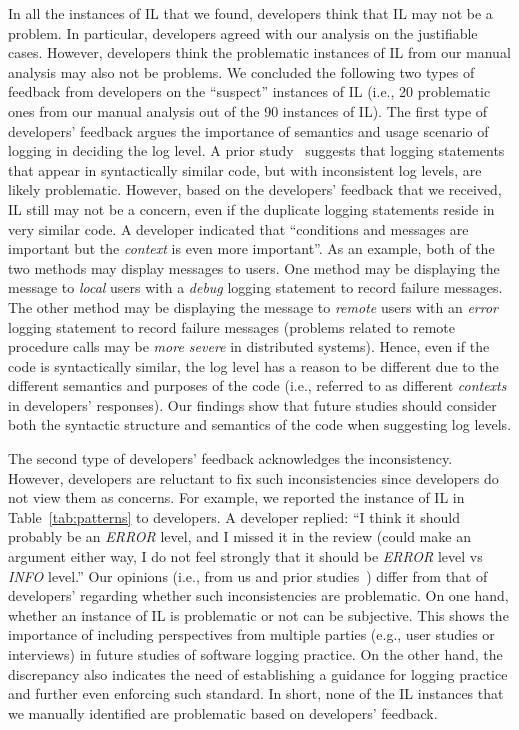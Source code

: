  In all the instances of IL that we found, developers think that IL may not be a problem. In particular, developers agreed with our analysis on the justifiable cases. However, developers think the problematic instances of IL from our manual analysis may also not be problems. We concluded the following two types of feedback from developers on the ``suspect'' instances of IL (i.e., 20 problematic ones from our manual analysis out of the 90 instances of IL).
The first type of developers' feedback argues the importance of semantics and usage scenario of logging in deciding the log level. A prior study~\cite{Yuan:2012:CLP:2337223.2337236} suggests that logging statements that appear in syntactically similar code, but with inconsistent log levels, are likely problematic. However, based on the developers' feedback that we received, IL still may not be a concern, even if the duplicate logging statements reside in very similar code. A developer indicated that ``conditions and messages are important but the {\it context} is even more important''. As an example, both of the two methods may display messages to users. One method may be displaying the message to {\em local} users with a {\em debug} logging statement to record failure messages. The other method may be displaying the message to {\em remote} users with an {\em error} logging statement to record failure messages (problems related to remote procedure calls may be {\em more severe} in distributed systems). Hence, even if the code is syntactically similar, the log level has a reason to be different due to the different semantics and purposes of the code (i.e., referred to as different {\it contexts} in developers' responses). Our findings show that future studies should consider both the syntactic structure and semantics of the code when suggesting log levels.

The second type of developers' feedback acknowledges the inconsistency. However, developers are reluctant to fix such inconsistencies since developers do not view them as concerns.
For example, we reported the instance of IL in Table~\ref{tab:patterns} to developers. A developer replied:
\noindent ``I think it should probably be an {\it ERROR} level, and I missed it in the review (could make an argument either way, I do not feel strongly that it should be {\it ERROR} level vs {\it INFO} level.'' %
Our opinions (i.e., from us and prior studies~\cite{Yuan:2012:CLP:2337223.2337236, Li2017}) differ from that of developers' regarding whether such inconsistencies are problematic.
On one hand, whether an instance of IL is problematic or not can be subjective. This shows the importance of including perspectives from multiple parties (e.g., user studies or interviews) in future studies of software logging practice.
On the other hand, the discrepancy also indicates the need of establishing a guidance for logging practice and further even enforcing such standard. In short, none of the IL instances that we manually identified are problematic based on developers' feedback. 



